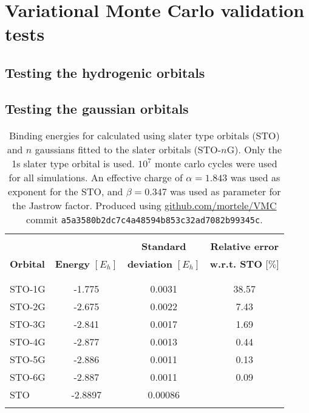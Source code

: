 \documentclass[a4paper]{article}
\title{}
\date{}
\author{}
\newcommand{\R}{\mathbb{R}}
\begin{document}
\renewcommand{\R}{{\bf R}}
\renewcommand{\r}{{\bf r}}
\newcommand{\p}{{\bf p}}
\newcommand{\q}{{\bf q}}
\renewcommand{\H}{\mathcal{H}}
\newcommand{\psit}{\left|\psi(t)\right\rangle}


\section{Variational Monte Carlo validation tests}


\subsection{Testing the hydrogenic orbitals}

\subsection{Testing the gaussian orbitals}


\begin{table}
\centering{}
\setlength\extrarowheight{2pt}
\begin{tabularx}{\textwidth}{X *{3}{S[table-format=-1.3,table-space-text-post=***]}}
\hline
\hline
\\[-0.9em]
                 &                          & \textbf{Standard}          & \textbf{Relative error}    \\
\textbf{Orbital} & \textbf{Energy} $[E_h]$  & \textbf{deviation} $[E_h]$ & \textbf{w.r.t. STO} [$\%$]  \\
\\[-0.9em]
\hline
\\[-0.9em]
STO-1G & -1.775  & 0.0031  &  38.57 \\
STO-2G & -2.675  & 0.0022  &   7.43 \\
STO-3G & -2.841  & 0.0017  &   1.69 \\
STO-4G & -2.877  & 0.0013  &   0.44 \\
STO-5G & -2.886  & 0.0011  &   0.13 \\
STO-6G & -2.887  & 0.0011  &   0.09 \\
STO    & -2.8897 & 0.00086 & \\
\\[-0.9em]
\hline
\end{tabularx}
\caption{Binding energies for  calculated using slater type orbitals (STO) and $n$ gaussians fitted to the slater orbitals (STO-$n$G). Only the 1s slater type orbital is used. $10^7$ monte carlo cycles were used for all simulations. An effective charge of $\alpha=1.843$ was used as exponent for the STO, and $\beta=0.347$ was used as parameter for the Jastrow factor. Produced using \url{github.com/mortele/VMC} commit \texttt{a5a3580b2dc7c4a48594b853c32ad7082b99345c}. \label{tab:vmcv1}}
\end{table}
\end{document}
